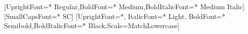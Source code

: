 \ifXeTeX
    \usepackage{fontspec}
    \setsansfont{Avenir Next}[UprightFont={* Regular},BoldFont={* Medium},BoldItalicFont={* Medium Italic}]
    \setmainfont{Alegreya}[SmallCapsFont={* SC}]
    \setmonofont{Source Code Pro}[UprightFont={*}, ItalicFont={* Light}, BoldFont={* Semibold},BoldItalicFont={* Black},Scale=MatchLowercase]
    

\else
    \usepackage{fourier}
\fi

